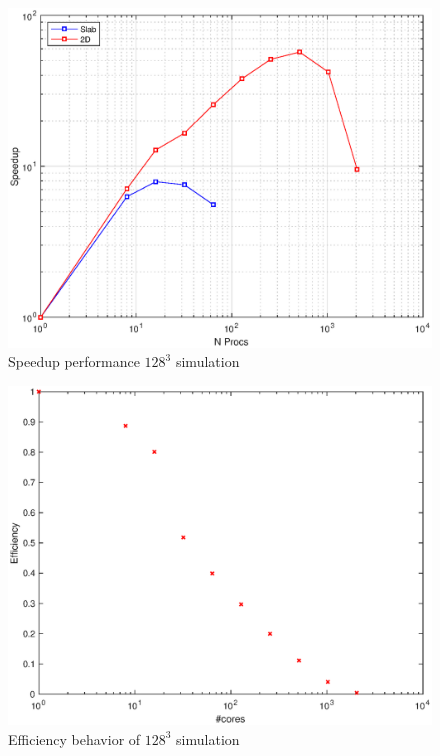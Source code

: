 \begin{figure}
\begin{center}
\includegraphics[scale=0.6]{grafici/642}
\caption{Speedup performance $128^3$ simulation}
\label{642}
\end{center}
\end{figure}

\begin{figure}
\begin{center}
\includegraphics[scale=0.6]{grafici/644}
\caption{Efficiency behavior of $128^3$ simulation}
\label{644}
\end{center}
\end{figure}
